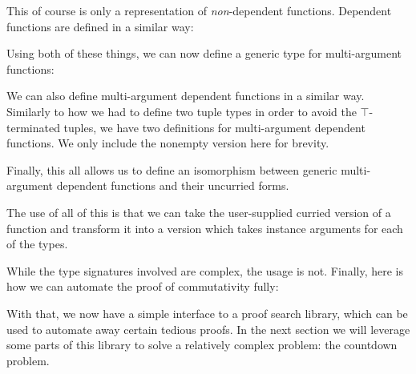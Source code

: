 This of course is only a representation of \emph{non}-dependent functions.
Dependent functions are defined in a similar way:
\begin{agdalisting*}
\end{agdalisting*}

Using both of these things, we can now define a generic type for multi-argument
functions:
\begin{agdalisting*}
\end{agdalisting*}
We can also define multi-argument dependent functions in a similar way.
Similarly to how we had to define two tuple types in order to avoid the
\(\top\)-terminated tuples, we have two definitions for multi-argument dependent
functions.
We only include the nonempty version here for brevity.
\begin{agdalisting*}
\end{agdalisting*}

Finally, this all allows us to define an isomorphism between generic
multi-argument dependent functions and their uncurried forms.
\begin{agdalisting*}
\end{agdalisting*}

The use of all of this is that we can take the user-supplied curried version of
a function and transform it into a version which takes instance arguments for
each of the types.
\begin{agdalisting*}
\end{agdalisting*}
\begin{agdalisting*}
\end{agdalisting*}
While the type signatures involved are complex, the usage is not.
Finally, here is how we can automate the proof of commutativity fully:
\begin{agdalisting*}
\end{agdalisting*}

With that, we now have a simple interface to a proof search library, which can
be used to automate away certain tedious proofs.
In the next section we will leverage some parts of this library to solve a
relatively complex problem: the countdown problem.
\newpage
